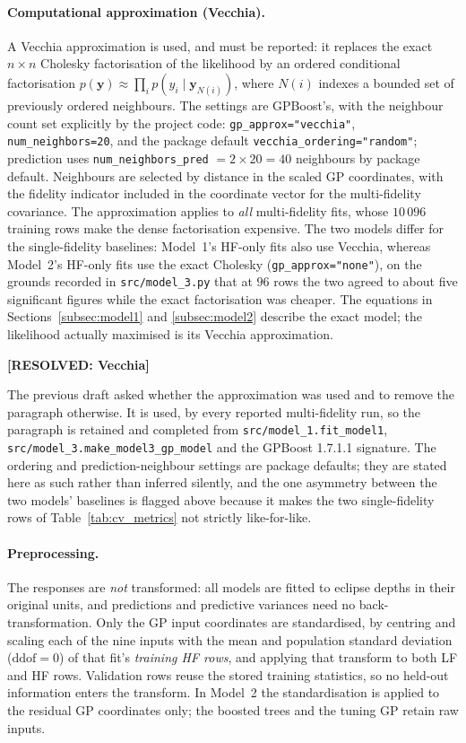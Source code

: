 \documentclass[12pt, letterpaper, oneside]{article}
\newcommand{\resolved}[2]{\par\begingroup\small\color{green!35!black}%
\noindent\textbf{[RESOLVED: #1]}\par\nobreak\noindent #2\par\endgroup}
\begin{document}
\paragraph{Computational approximation (Vecchia).}
A Vecchia approximation is used, and must be reported: it replaces the exact
$n\times n$ Cholesky factorisation of the likelihood by an ordered conditional
factorisation
$p(\mathbf y)\approx\prod_{i}p(y_i\mid \mathbf y_{N(i)})$, where $N(i)$
indexes a bounded set of previously ordered neighbours. The settings are
GPBoost's, with the neighbour count set explicitly by the project code:
\texttt{gp\_approx="vecchia"}, \texttt{num\_neighbors=20}, and the package
default \texttt{vecchia\_ordering="random"}; prediction uses
\texttt{num\_neighbors\_pred} $=2\times20=40$ neighbours by package default.
Neighbours are selected by distance in the scaled GP coordinates, with the
fidelity indicator included in the coordinate vector for the multi-fidelity
covariance. The approximation applies to \emph{all} multi-fidelity fits, whose
$10\,096$ training rows make the dense factorisation expensive. The two models
differ for the single-fidelity baselines: Model~1's HF-only fits also use
Vecchia, whereas Model~2's HF-only fits use the exact Cholesky
(\texttt{gp\_approx="none"}), on the grounds recorded in
\texttt{src/model\_3.py} that at $96$ rows the two agreed to about five
significant figures while the exact factorisation was cheaper. The equations
in Sections~\ref{subsec:model1} and \ref{subsec:model2} describe the exact
model; the likelihood actually maximised is its Vecchia approximation.

\resolved{Vecchia}{The previous draft asked whether the approximation was used
and to remove the paragraph otherwise. It is used, by every reported
multi-fidelity run, so the paragraph is retained and completed from
\texttt{src/model\_1.fit\_model1}, \texttt{src/model\_3.make\_model3\_gp\_model}
and the GPBoost 1.7.1.1 signature. The ordering and prediction-neighbour
settings are package defaults; they are stated here as such rather than
inferred silently, and the one asymmetry between the two models' baselines is
flagged above because it makes the two single-fidelity rows of
Table~\ref{tab:cv_metrics} not strictly like-for-like.}

\paragraph{Preprocessing.} The responses are \emph{not} transformed: all models
are fitted to eclipse depths in their original units, and predictions and
predictive variances need no back-transformation. Only the GP input
coordinates are standardised, by centring and scaling each of the nine inputs
with the mean and population standard deviation ($\mathrm{ddof}=0$) of that
fit's \emph{training HF rows}, and applying that transform to both LF and HF
rows. Validation rows reuse the stored training statistics, so no held-out
information enters the transform. In Model~2 the standardisation is applied to
the residual GP coordinates only; the boosted trees and the tuning GP retain
raw inputs.
\end{document}
